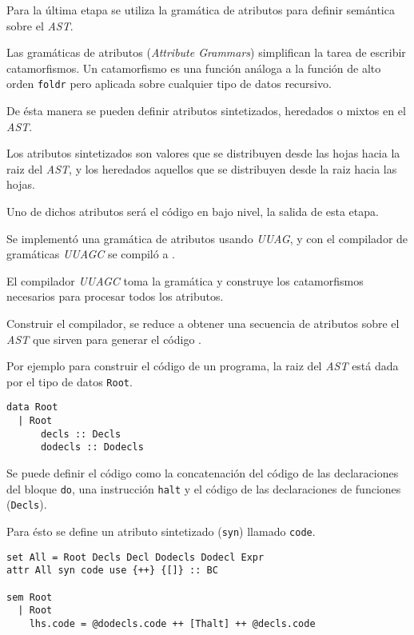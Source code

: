   Para la última etapa se utiliza la gramática de atributos para definir
semántica sobre el \emph{AST}.


Las gramáticas de atributos \cite{attributegrammar}(\emph{Attribute Grammars}) simplifican
la tarea de escribir catamorfismos.
Un catamorfismo es una función análoga a la función de alto orden
\texttt{foldr} pero aplicada sobre cualquier tipo de datos recursivo.

  De ésta manera se pueden definir atributos sintetizados,
  heredados o mixtos en el \emph{AST}.

  Los atributos sintetizados son valores que se distribuyen desde las
hojas hacia la raiz del \emph{AST}, y los heredados aquellos que
se distribuyen desde la raiz hacia las hojas.

  Uno de dichos atributos será el código en bajo nivel, la salida
de esta etapa.

  Se implementó una gramática de atributos usando \textit{UUAG}, y con
  el compilador de gramáticas \textit{UUAGC}\cite{uuagc} se
  compiló a \haskell{}.

  El compilador \textit{UUAGC} toma la gramática y construye los
  catamorfismos necesarios para procesar todos los atributos.

  Construir el compilador, se reduce a obtener una secuencia de atributos
  sobre el \textit{AST} que sirven para generar el código \alf{}.

  Por ejemplo para construir el código de un programa, la raiz
  del \textit{AST} está dada por el tipo de datos \texttt{Root}.

\begin{Verbatim}
data Root
  | Root
      decls :: Decls
      dodecls :: Dodecls
\end{Verbatim}

  Se puede definir el código como la concatenación del código de
  las declaraciones del bloque \texttt{do}, una instrucción \texttt{halt}
  y el código de las declaraciones de funciones (\texttt{Decls}).

  Para ésto se define un atributo sintetizado (\texttt{syn})
  llamado \texttt{code}.


\begin{Verbatim}
set All = Root Decls Decl Dodecls Dodecl Expr
attr All syn code use {++} {[]} :: BC

sem Root
  | Root
    lhs.code = @dodecls.code ++ [Thalt] ++ @decls.code
\end{Verbatim}

